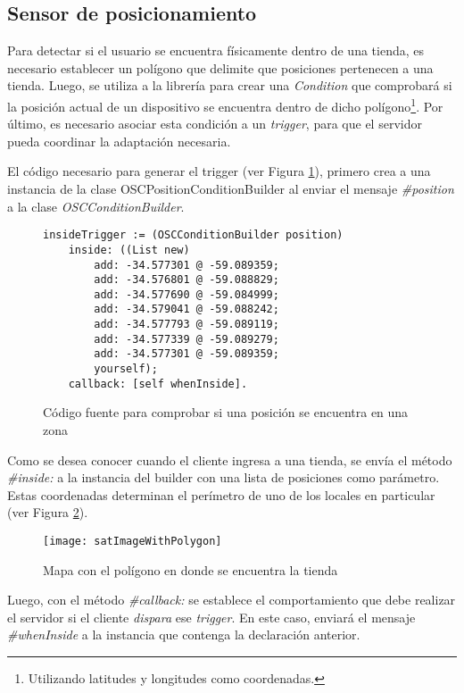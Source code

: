 \subsection{Sensor de posicionamiento}

Para detectar si el usuario se encuentra físicamente dentro de una tienda, es necesario establecer un polígono que delimite que posiciones pertenecen a una tienda. Luego, se utiliza a la librería para crear una \emph{Condition} que comprobará si la posición actual de un dispositivo se encuentra dentro de dicho polígono\footnote{Utilizando latitudes y longitudes como coordenadas.}. Por último, es necesario asociar esta condición a un \emph{trigger}, para que el servidor pueda coordinar la adaptación necesaria.

El código necesario para generar el trigger (ver Figura \ref{PositionInsideZoneExample}), primero crea a una instancia de la clase OSCPositionConditionBuilder al enviar el mensaje \emph{\#position} a la clase \emph{OSCConditionBuilder}.

\begin{figure}[ht!]
\begin{Verbatim}
insideTrigger := (OSCConditionBuilder position)
	inside: ((List new)
		add: -34.577301 @ -59.089359;
		add: -34.576801 @ -59.088829;
		add: -34.577690 @ -59.084999;
		add: -34.579041 @ -59.088242;
		add: -34.577793 @ -59.089119;
		add: -34.577339 @ -59.089279;
		add: -34.577301 @ -59.089359;
		yourself);
	callback: [self whenInside].
\end{Verbatim}
\caption{Código fuente para comprobar si una posición se encuentra en una zona}
\label{PositionInsideZoneExample}
\end{figure}

Como se desea conocer cuando el cliente ingresa a una tienda, se envía el método \emph{\#inside:} a la instancia del builder con una lista de posiciones como parámetro. Estas coordenadas determinan el perímetro de uno de los locales en particular (ver Figura \ref{satImageWithPolygon}).

\begin{figure}[ht!]
\centering
\texttt{[image: satImageWithPolygon]}
\caption{Mapa con el polígono en donde se encuentra la tienda}
\label{satImageWithPolygon}
\end{figure}

Luego, con el método \emph{\#callback:} se establece el comportamiento que debe realizar el servidor si el cliente \emph{dispara} ese \emph{trigger}. En este caso, enviará el mensaje \emph{\#whenInside} a la instancia que contenga la declaración anterior.

